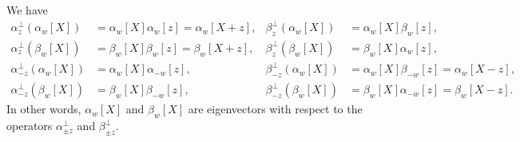 \documentclass[10pt,a4paper]{amsart}
\begin{document}
    \begin{proposition}\label{prop: action of adjoint}
        We have
        \begin{align*}
            \alpha_z^\perp(\alpha_w[X])&=\alpha_w[X]\alpha_w[z]=\alpha_w[X+z],&
            \beta_{z}^\perp (\alpha_w[X])&=\alpha_w[X]\beta_w[z],\\
            \alpha_z^\perp (\beta_w[X])&=\beta_w[X]\beta_w[z]=\beta_w[X+z],&
            \beta_{z}^\perp (\beta_w[X])&=\beta_w[X]\alpha_w[z],\\
            \alpha_{-z}^\perp (\alpha_w[X])&=\alpha_w[X]\alpha_{-w}[z],&
            \beta_{-z}^\perp (\alpha_w[X])&=\alpha_w[X]\beta_{-w}[z]=\alpha_w[X-z],\\
            \alpha_{-z}^\perp (\beta_w[X])&=\beta_w[X]\beta_{-w}[z],&
            \beta_{-z}^\perp (\beta_w[X])&=\beta_w[X]\alpha_{-w}[z]=\beta_w[X-z].
        \end{align*}
        In other words, $\alpha_w[X]$ and $\beta_w[X]$ are eigenvectors with respect to the operators $\alpha_{\pm z}^\perp$ and $\beta_{\pm z}^\perp$.
    \end{proposition}
\end{document}

